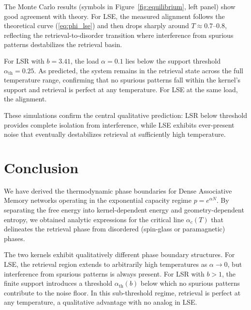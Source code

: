 \documentclass{article}
\theoremstyle{plain}
\theoremstyle{definition}
\theoremstyle{remark}
\begin{document}
The Monte Carlo results (symbols in Figure~\ref{fig:equilibrium}, left panel) show good agreement with theory. For LSE, the measured alignment follows the theoretical curve (\ref{eq:phi_lse}) and then drops sharply around $T \approx 0.7$--$0.8$, reflecting the retrieval-to-disorder transition where interference from spurious patterns destabilizes the retrieval basin.

For LSR with $b = 3.41$, the load $\alpha = 0.1$ lies below the support threshold $\alpha_{\text{th}} = 0.25$. As predicted, the system remains in the retrieval state across the full temperature range, confirming that no spurious patterns fall within the kernel's support and retrieval is perfect at any temperature. For LSE at the same load, the alignment.

These simulations confirm the central qualitative prediction: LSR below threshold provides complete isolation from interference, while LSE exhibits ever-present noise that eventually destabilizes retrieval at sufficiently high temperature.


\section{Conclusion}\label{sec:conclusion}

We have derived the thermodynamic phase boundaries for Dense Associative Memory networks operating in the exponential capacity regime $p = e^{\alpha N}$. By separating the free energy into kernel-dependent energy and geometry-dependent entropy, we obtained analytic expressions for the critical line $\alpha_c(T)$ that delineates the retrieval phase from disordered (spin-glass or paramagnetic) phases.


The two kernels exhibit qualitatively different phase boundary structures. For LSE, the retrieval region extends to arbitrarily high temperatures as $\alpha \to 0$, but interference from spurious patterns is always present. For LSR with $b > 1$, the finite support introduces a threshold $\alpha_{\text{th}}(b)$ below which no spurious patterns contribute to the noise floor. In this sub-threshold regime, retrieval is perfect at any temperature, a qualitative advantage with no analog in LSE.
\end{document}
